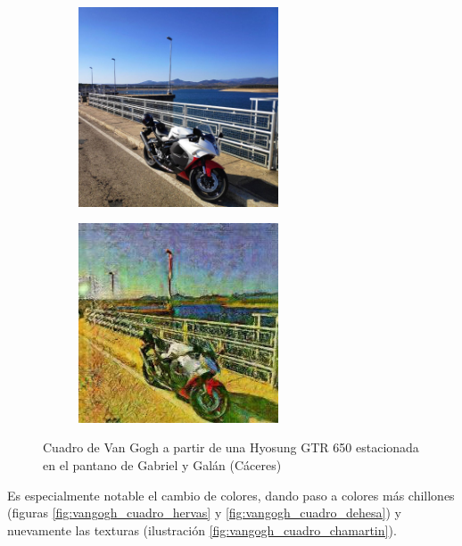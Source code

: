 \documentclass[[../main.tex]{subfiles}
\begin{document}
        \begin{figure}[!htb]
            \begin{subfigure}[b]{0.49\textwidth}
            \includegraphics[width=0.65\textwidth]{imagenes/imagen2cuadro/propias/vangogh/photo_2020-10-23_16-26-00.jpg}
            \end{subfigure}
        \hfill
            \begin{subfigure}[b]{0.49\textwidth}
            \includegraphics[width=0.65\textwidth]{imagenes/imagen2cuadro/propias/vangogh/photo_2020-10-23_16-26-00_2.jpg}
            \end{subfigure}
        \caption{Cuadro de Van Gogh a partir de una Hyosung GTR 650 estacionada en el pantano de Gabriel y Galán (Cáceres)}
        \label{fig:vangogh_cuadro_pantano_gabriel}
        \end{figure}
        
        Es especialmente notable el cambio de colores, dando paso a colores más chillones (figuras \ref{fig:vangogh_cuadro_hervas} y \ref{fig:vangogh_cuadro_dehesa}) y nuevamente las texturas (ilustración \ref{fig:vangogh_cuadro_chamartin}).
        
\end{document}
